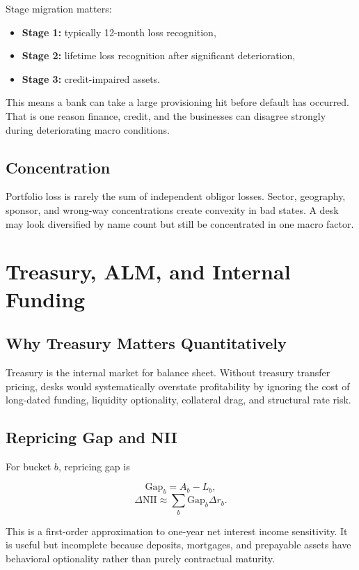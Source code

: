 \documentclass{apex_mdd}
\begin{document}
Stage migration matters:
\begin{itemize}
  \item \textbf{Stage 1:} typically 12-month loss recognition,
  \item \textbf{Stage 2:} lifetime loss recognition after significant deterioration,
  \item \textbf{Stage 3:} credit-impaired assets.
\end{itemize}

This means a bank can take a large provisioning hit before default has occurred. That is one reason finance, credit, and the businesses can disagree strongly during deteriorating macro conditions.

\subsection{Concentration}

Portfolio loss is rarely the sum of independent obligor losses. Sector, geography, sponsor, and wrong-way concentrations create convexity in bad states. A desk may look diversified by name count but still be concentrated in one macro factor.

\section{Treasury, ALM, and Internal Funding}

\subsection{Why Treasury Matters Quantitatively}

Treasury is the internal market for balance sheet. Without treasury transfer pricing, desks would systematically overstate profitability by ignoring the cost of long-dated funding, liquidity optionality, collateral drag, and structural rate risk.

\subsection{Repricing Gap and NII}

For bucket $b$, repricing gap is
\begin{formulabox}
\[
  \mathrm{Gap}_b = A_b - L_b,
\]
\[
  \Delta \mathrm{NII}
  \approx
  \sum_b \mathrm{Gap}_b \Delta r_b.
\]
\end{formulabox}

This is a first-order approximation to one-year net interest income sensitivity. It is useful but incomplete because deposits, mortgages, and prepayable assets have behavioral optionality rather than purely contractual maturity.
\end{document}
